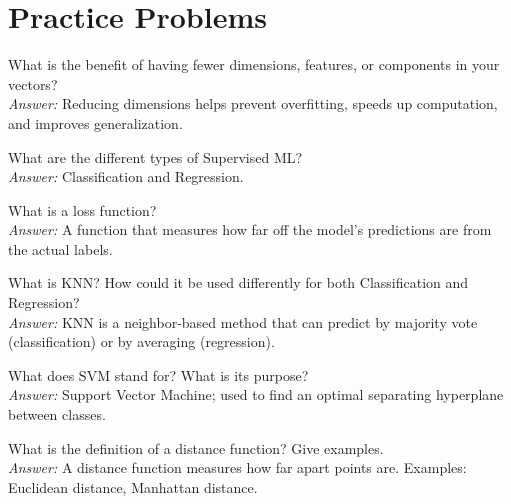 \section{Practice Problems}
\begin{outline}[enumerate]
    \1 What is the benefit of having fewer dimensions, features, or components in your vectors? \\
    \textit{Answer:} Reducing dimensions helps prevent overfitting, speeds up computation, and improves generalization.
    
    \1 What are the different types of Supervised ML? \\
    \textit{Answer:} Classification and Regression.
    
    \1 What is a loss function? \\
    \textit{Answer:} A function that measures how far off the model’s predictions are from the actual labels.
    
    \1 What is KNN? How could it be used differently for both Classification and Regression? \\
    \textit{Answer:} KNN is a neighbor-based method that can predict by majority vote (classification) or by averaging (regression).
    
    \1 What does SVM stand for? What is its purpose? \\
    \textit{Answer:} Support Vector Machine; used to find an optimal separating hyperplane between classes.
    
    \1 What is the definition of a distance function? Give examples. \\
    \textit{Answer:} A distance function measures how far apart points are. Examples: Euclidean distance, Manhattan distance.
\end{outline}


